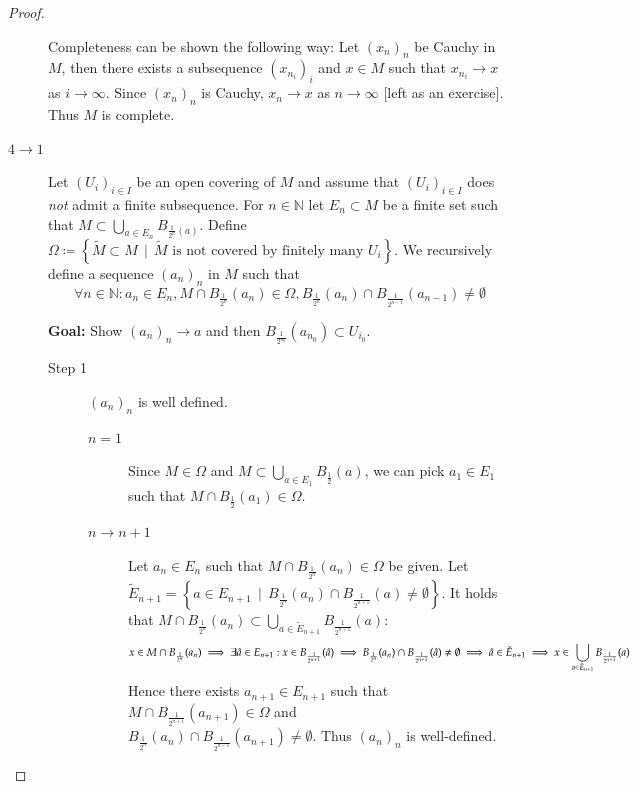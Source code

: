 \documentclass[a4paper]{article}
\numberwithin{lecref}{section}
\newcommand{\SetDef}[2]{\left\{#1\,\mid\,#2\right\}}
\begin{document}
\begin{proof}
\begin{description}
			Completeness can be shown the following way:
			Let $(x_n)_n$ be Cauchy in $M$, then there exists a subsequence $(x_{n_i})_i$ and $x \in M$ such that $x_{n_i} \to x$ as $i \to \infty$.
			Since $(x_n)_n$ is Cauchy, $x_n \to x$ as $n \to \infty$ [left as an exercise]. Thus $M$ is complete.
		\item[$4 \to 1$]
			Let $(U_i)_{i \in I}$ be an open covering of $M$ and assume that $(U_i)_{i \in I}$ does \emph{not} admit a finite subsequence.
			For $n \in \mathbb N$ let $E_n \subset M$ be a finite set such that $M \subset \bigcup_{a \in E_n} B_{\frac1{2^n}(a)}$.
			Define $\Omega \coloneqq \SetDef{\tilde M \subset M}{\tilde M \text{ is not covered by finitely many } U_i}$.
			We recursively define a sequence $(a_n)_n$ in $M$ such that
			\[ \forall n \in \mathbb N: a_n \in E_n, M \cap B_{\frac1{2^n}}(a_n) \in \Omega, B_{\frac{1}{2^n}}(a_n) \cap B_{\frac{1}{2^{n-1}}}(a_{n-1}) \neq \emptyset \]

			\textbf{Goal:} Show $(a_n)_n \to a$ and then $B_{\frac{1}{2^{n_0}}}(a_{n_0}) \subset U_{i_0}$.

			\begin{description}
				\item[Step 1]
					$(a_n)_n$ is well defined.
					\begin{description}
						\item[$n=1$] Since $M \in \Omega$ and $M \subset \bigcup_{a \in E_1} B_{\frac12}(a)$, we can pick $a_1 \in E_1$ such that $M \cap B_{\frac12}(a_1) \in \Omega$.
						\item[$n \to n+1$]
							Let $a_n \in E_n$ such that $M \cap B_{\frac1{2^n}}(a_n) \in \Omega$ be given.
							Let $\tilde E_{n+1} = \SetDef{a \in E_{n+1}}{B_{\frac1{2^n}}(a_n) \cap B_{\frac1{2^{n+1}}}(a) \neq \emptyset}$.
							It holds that $M \cap B_{\frac1{2^n}}(a_n) \subset \bigcup_{a \in \tilde E_{n+1}} B_{\frac{1}{2^{n+1}}}(a)$:
							\[
								x \in M \cap B_{\frac1{2^n}}(a_n) \implies \exists \hat a \in E_{n + 1} : x \in B_{\frac{1}{2^{n + 1}}}(\hat a) \\
								\implies B_{\frac1{2^n}}(a_n) \cap B_{\frac{1}{2^{n + 1}}}(\hat a) \neq \emptyset \implies \hat a \in \tilde E_{n + 1} \implies x \in \bigcup_{a \in \tilde E_{n + 1}} B_{\frac1{2^{n + 1}}}(a)
							\]
							Hence there exists $a_{n+1} \in E_{n + 1}$ such that $M \cap B_{\frac{1}{2^{n+1}}}(a_{n+1}) \in \Omega$ and \\ $B_{\frac{1}{2^n}}(a_n) \cap B_{\frac{1}{2^{n-1}}}(a_{n+1}) \neq \emptyset$.
							Thus $(a_n)_n$ is well-defined.
					\end{description}


\end{description}
\end{description}
\end{proof}
\end{document}
